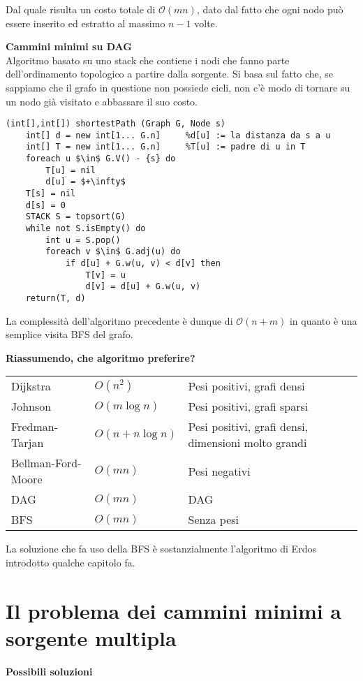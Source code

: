 \documentclass[../cheatSheetAlgoritmi.tex]{subfiles}
\begin{document}
\bigskip
Dal quale risulta un costo totale di $\mathcal{O}(mn)$, dato dal fatto che ogni nodo può essere inserito ed estratto al massimo $n-1$ volte.

 
\textbf{Cammini minimi su DAG} \\
Algoritmo basato su uno stack che contiene i nodi che fanno parte dell'ordinamento topologico a partire dalla sorgente. Si basa sul fatto che, se sappiamo che il grafo in questione non possiede cicli, non c'è modo di tornare su un nodo già visitato e abbassare il suo costo.
\begin{lstlisting}[caption=Algoritmo per i DAG: cammini minimi a sorgente singola]
(int[],int[]) shortestPath (Graph G, Node s)
	int[] d = new int[1... G.n]		%d[u] := la distanza da s a u 
	int[] T = new int[1... G.n]		%T[u] := padre di u in T
	foreach u $\in$ G.V() - {s} do
		T[u] = nil
		d[u] = $+\infty$
	T[s] = nil
	d[s] = 0
	STACK S = topsort(G)
	while not S.isEmpty() do 
		int u = S.pop()
		foreach v $\in$ G.adj(u) do
			if d[u] + G.w(u, v) < d[v] then 
				T[v] = u 
				d[v] = d[u] + G.w(u, v)
	return(T, d)
\end{lstlisting}
La complessità dell'algoritmo precedente è dunque di $\mathcal{O}(n + m)$ in quanto è una semplice visita BFS del grafo.

\bigskip
\textbf{Riassumendo, che algoritmo preferire?}

\bigskip
\begin{tabular}{lllll}
Dijkstra       &  $O(n^2)$ & Pesi positivi, grafi densi &  \\
Johnson        &  $O(m \log n)$ &  Pesi positivi, grafi sparsi &  \\
Fredman-Tarjan &  $O(n + n \log n)$ & Pesi positivi, grafi densi, dimensioni molto grandi  & \\
Bellman-Ford-Moore &  $O(mn)$ & Pesi negativi &  \\
DAG               & $O(mn)$ & DAG  &  \\
BFS	 & $O(mn)$ & Senza pesi &  \\
\end{tabular}

\bigskip
La soluzione che fa uso della BFS è sostanzialmente l'algoritmo di Erdos introdotto qualche capitolo fa.

\section{Il problema dei cammini minimi a sorgente multipla}
\textbf{Possibili soluzioni}
\end{document}

